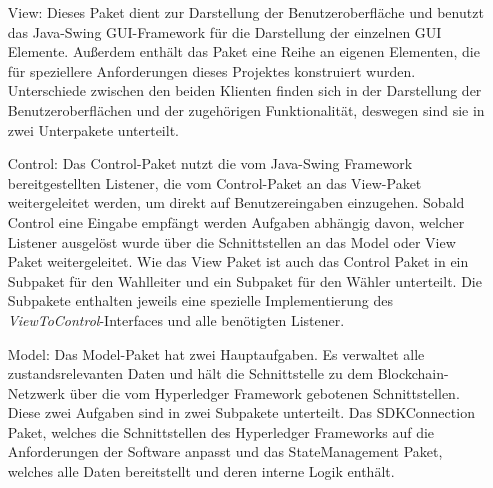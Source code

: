 \documentclass[parskip=full]{scrartcl}
\newcommand{\textitx}[1]{\mbox{\textit{#1}}}
\begin{document}
	\begin{itemize}
		\item[View:] Dieses Paket dient zur Darstellung der Benutzeroberfläche und benutzt das Java-Swing GUI-Framework für die Darstellung der einzelnen GUI Elemente. Außerdem enthält das Paket eine Reihe an eigenen Elementen, die für speziellere Anforderungen dieses Projektes konstruiert wurden. Unterschiede zwischen den beiden Klienten finden sich in der Darstellung der Benutzeroberflächen und der zugehörigen Funktionalität, deswegen sind sie in zwei Unterpakete unterteilt.
		\item[Control:] Das Control-Paket nutzt die vom Java-Swing Framework bereitgestellten Listener, die vom Control-Paket an das View-Paket weitergeleitet werden, um direkt auf Benutzereingaben einzugehen. Sobald Control eine Eingabe empfängt werden Aufgaben abhängig davon, welcher Listener ausgelöst wurde über die Schnittstellen an das Model oder View Paket weitergeleitet. Wie das View Paket ist auch das Control Paket in ein Subpaket für den Wahlleiter und ein Subpaket für den Wähler unterteilt. Die Subpakete enthalten jeweils eine spezielle Implementierung des \textitx{ViewToControl}-Interfaces und alle benötigten Listener.
		\item[Model:] Das Model-Paket hat zwei Hauptaufgaben. Es verwaltet alle zustandsrelevanten Daten und hält die Schnittstelle zu dem Blockchain-Netzwerk über die vom Hyperledger Framework gebotenen Schnittstellen. Diese zwei Aufgaben sind in zwei Subpakete unterteilt. Das SDKConnection Paket, welches die Schnittstellen des Hyperledger Frameworks auf die Anforderungen der Software anpasst und das StateManagement Paket, welches alle Daten bereitstellt und deren interne Logik enthält.   
	\end{itemize} 
\end{document}
